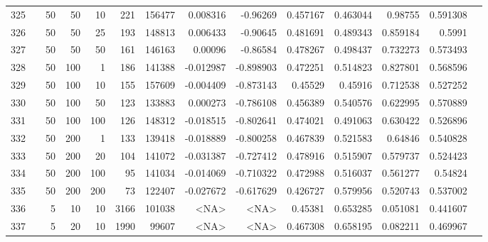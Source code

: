 \begin{longtable}{llrrrrrrrrrrrr}
		325 & &           50 &                50 &           10 &         221 &     156477 &  0.008316 &  -0.96269 &  0.457167 &    0.463044 &        0.98755 &  0.591308 \\
		326 & &           50 &                50 &           25 &         193 &     148813 &  0.006433 &  -0.90645 &  0.481691 &    0.489343 &       0.859184 &    0.5991 \\
		327 & &           50 &                50 &           50 &         161 &     146163 &   0.00096 &  -0.86584 &  0.478267 &    0.498437 &       0.732273 &  0.573493 \\
		328 & &           50 &               100 &            1 &         186 &     141388 & -0.012987 & -0.898903 &  0.472251 &    0.514823 &       0.827801 &  0.568596 \\
		329 & &           50 &               100 &           10 &         155 &     157609 & -0.004409 & -0.873143 &   0.45529 &     0.45916 &       0.712538 &  0.527252 \\
		330 & &           50 &               100 &           50 &         123 &     133883 &  0.000273 & -0.786108 &  0.456389 &    0.540576 &       0.622995 &  0.570889 \\
		331 & &           50 &               100 &          100 &         126 &     148312 & -0.018515 & -0.802641 &  0.474021 &    0.491063 &       0.630422 &  0.526896 \\
		332 & &           50 &               200 &            1 &         133 &     139418 & -0.018889 & -0.800258 &  0.467839 &    0.521583 &        0.64846 &  0.540828 \\
		333 & &           50 &               200 &           20 &         104 &     141072 & -0.031387 & -0.727412 &  0.478916 &    0.515907 &       0.579737 &  0.524423 \\
		334 & &           50 &               200 &          100 &          95 &     141034 & -0.014069 & -0.710322 &  0.472988 &    0.516037 &       0.561277 &   0.54824 \\
		335 & &           50 &               200 &          200 &          73 &     122407 & -0.027672 & -0.617629 &  0.426727 &    0.579956 &       0.520743 &  0.537002 \\\midrule
		336 & \multirow[t]{84}{*}{\rotatebox[origin=r]{90}{tfidf}} &            5 &                10 &           10 &        3166 &     101038 &      <NA> &      <NA> &   0.45381 &    0.653285 &       0.051081 &  0.441607 \\
		337 & &            5 &                20 &           10 &           1990 &      99607 &      <NA> &      <NA> &  0.467308 &    0.658195 &       0.082211 &  0.469967 \\

\end{longtable}
